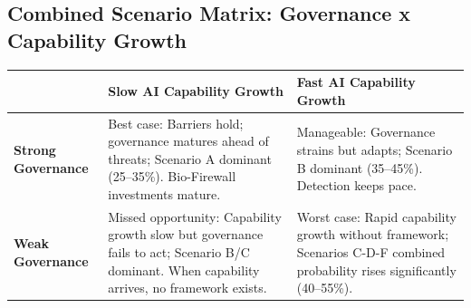 \documentclass[11pt,letterpaper]{article}
\begin{document}
\subsection{Combined Scenario Matrix: Governance x Capability Growth}

\begin{center}
\small
\begin{tabular}{L{2.5cm}|L{5cm}|L{5cm}}
\toprule
& \textbf{Slow AI Capability Growth} & \textbf{Fast AI Capability Growth} \\
\midrule
\textbf{Strong Governance} & Best case: Barriers hold; governance matures ahead of threats; Scenario A dominant (25--35\%). Bio-Firewall investments mature. & Manageable: Governance strains but adapts; Scenario B dominant (35--45\%). Detection keeps pace. \\
\midrule
\textbf{Weak Governance} & Missed opportunity: Capability growth slow but governance fails to act; Scenario B/C dominant. When capability arrives, no framework exists. & Worst case: Rapid capability growth without framework; Scenarios C-D-F combined probability rises significantly (40--55\%). \\
\bottomrule
\end{tabular}
\end{center}
\end{document}

